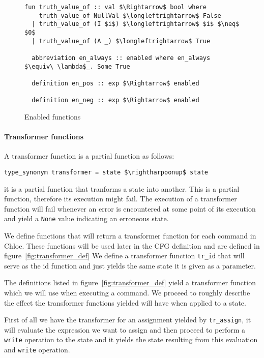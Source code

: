 \begin{figure}
  \begin{lstlisting}[frame=single, mathescape=true]
  fun truth_value_of :: val $\Rightarrow$ bool where
    truth_value_of NullVal $\longleftrightarrow$ False
  | truth_value_of (I $i$) $\longleftrightarrow$ $i$ $\neq$ $0$
  | truth_value_of (A _) $\longleftrightarrow$ True

  abbreviation en_always :: enabled where en_always $\equiv\ \lambda$_. Some True

  definition en_pos :: exp $\Rightarrow$ enabled

  definition en_neg :: exp $\Rightarrow$ enabled
  \end{lstlisting}

  \caption{Enabled functions}
  \label{fig:enabled_def}
\end{figure}


\paragraph{Transformer functions}\label{paragraph:transformer}

A transformer function is a partial function as follows:

\begin{lstlisting}[mathescape=true, frame=single]
type_synonym transformer = state $\rightharpoonup$ state
\end{lstlisting}

it is a partial function that tranforms a state into another.
This is a partial function, therefore its execution might fail.
The execution of a transformer function will fail whenever an error is encountered at some point of its execution and yield a \verb|None| value indicating an erroneous state.

We define functions that will return a transformer function for each command in Chloe.
These functions will be used later in the CFG definition and are defined in figure~\ref{fig:transformer_def}
We define a transformer function \verb|tr_id| that will serve as the id function and just yields the same state it is given as a parameter.

The definitions listed in figure~\ref{fig:transformer_def} yield a transformer function which we will use when executing a command.
We proceed to roughly describe the effect the transformer functions yielded will have when applied to a state.

First of all we have the transformer for an assignment yielded by \verb|tr_assign|, it will evaluate the expression we want to assign and then proceed to perform a \verb|write| operation to the state and it yields the state resulting from this evaluation and \verb|write| operation.

